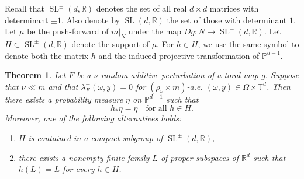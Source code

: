 \documentclass[a4paper,12pt,reqno]{amsart}
\numberwithin{equation}{section}
\newtheorem{theorem}{Theorem}[section]
\newtheorem{proposition}[theorem]{Proposition}
\newcommand{\Pp}{{\mathbb{P}}}
\newcommand{\Rr}{{\mathbb{R}}}
\newcommand{\Tt}{{\mathbb{T}}}
\def\SL{\operatorname{SL}}
\begin{document}
Recall that $\SL^{\pm}(d,\Rr)$ denotes the set of all real $d\times d$ matrices with determinant $\pm1$. Also denote by $\SL(d,\Rr)$ the set of those with determinant
$1$. Let $\mu$ be the push-forward of $m|_N$ under the map $Dg\colon N\to \SL^{\pm}(d,\Rr)$. Let $H\subset \SL^{\pm}(d,\Rr)$ denote the support of $\mu$. For $h\in H$, we use the same symbol to denote both the matrix $h$ and the induced projective transformation of $\Pp^{d-1}$.


\begin{theorem}
\label{thm:invariant}
Let $F$ be a $\nu$-random additive perturbation of a toral map $g$.
Suppose that $\nu\ll m$ and that $\lambda_F^+(\omega,y)=0$ for $(\rho_\nu\times m)$-a.e. $(\omega,y)\in\Omega\times\Tt^d$. Then there exists a probability measure $\eta$ on $\mathbb P^{d-1}$ such that
\[
h_*\eta=\eta
\quad\text{for all }h\in H.
\]
Moreover, one of the following alternatives holds:
\begin{enumerate}
\item $H$ is contained in a compact subgroup of $\SL^{\pm}(d,\Rr)$,
\item there exists a nonempty finite family $L$ of proper subspaces of $\Rr^d$
such that $h(L)=L$ for every $h\in H$.
\end{enumerate}
\end{theorem}
\end{document}
